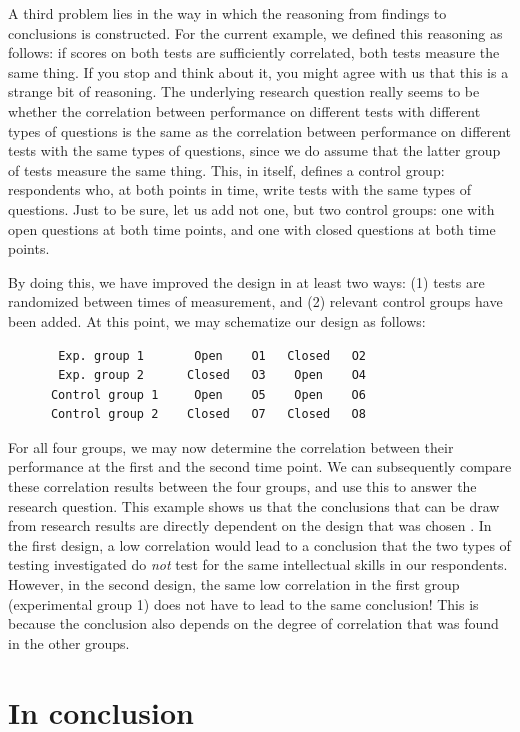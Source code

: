 \documentclass[
]{book}
\begin{document}
A third problem lies in the way in which the reasoning from findings to conclusions is constructed. For the current example, we defined this reasoning as follows: if scores on both tests are sufficiently correlated, both tests measure the same thing. If you stop and think about it, you might agree with us that this is a strange bit of reasoning. The underlying research question really seems to be whether the correlation between performance on different tests with different types of questions is the same as the correlation between performance on different tests with the same types of questions, since we do assume that the latter group of tests measure the same thing. This, in itself, defines a control group: respondents who, at both points in time, write tests with the same types of questions. Just to be sure, let us add not one, but two control groups: one with open questions at both time points, and one with closed questions at both time points.

By doing this, we have improved the design in at least two ways: (1) tests are randomized between times of measurement, and (2) relevant control groups have been added. At this point, we may schematize our design as follows:

\begin{verbatim}
       Exp. group 1       Open    O1   Closed   O2
       Exp. group 2      Closed   O3    Open    O4
      Control group 1     Open    O5    Open    O6
      Control group 2    Closed   O7   Closed   O8
\end{verbatim}

For all four groups, we may now determine the correlation between their performance at the first and the second time point. We can subsequently compare these correlation results between the four groups, and use this to answer the research question. This example shows us that the conclusions that can be draw from research results are directly dependent on the design that was chosen \citep{Levin99}. In the first design, a low correlation would lead to a conclusion that the two types of testing investigated do \emph{not} test for the same intellectual skills in our respondents. However, in the second design, the same low correlation in the first group (experimental group 1) does not have to lead to the same conclusion! This is because the conclusion also depends on the degree of correlation that was found in the other groups.

\hypertarget{in-conclusion}{%
\section{In conclusion}\label{in-conclusion}}
\end{document}
